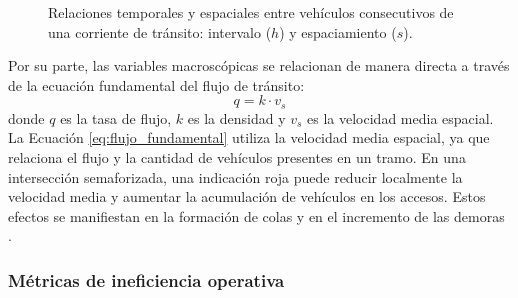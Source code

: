 \begin{figure}[!htbp]
    \caption{Relaciones temporales y espaciales entre vehículos consecutivos de una corriente de tránsito: intervalo ($h$) y espaciamiento ($s$).}
    \label{fig:variables_microscopicas}
\end{figure}

Por su parte, las variables macroscópicas se relacionan de manera directa a través de la ecuación fundamental del flujo de tránsito:
\begin{equation}
    q = k \cdot v_s
    \label{eq:flujo_fundamental}
\end{equation}
donde $q$ es la tasa de flujo, $k$ es la densidad y $v_s$ es la velocidad media espacial. La Ecuación \eqref{eq:flujo_fundamental} utiliza la velocidad media espacial, ya que relaciona el flujo y la cantidad de vehículos presentes en un tramo. En una intersección semaforizada, una indicación roja puede reducir localmente la velocidad media y aumentar la acumulación de vehículos en los accesos. Estos efectos se manifiestan en la formación de colas y en el incremento de las demoras \cite{calymayor}.

\subsubsection{Métricas de ineficiencia operativa}

